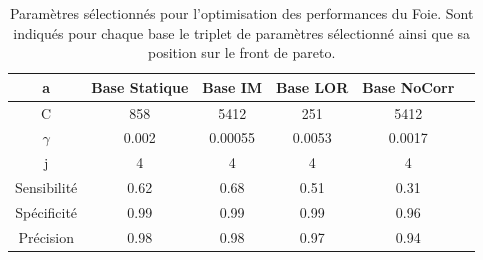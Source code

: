 \begin{table}[h!]
		\begin{tabular}{c| c c c c c}
  \hline
  a	& Base Statique	& Base IM	& Base LOR	& Base NoCorr	\\
  \hline
 C 	& 858		& 5412		& 251		& 5412		\\
\hline
$\gamma$& 0.002		& 0.00055	& 0.0053	& 0.0017	\\
\hline
j	& 4		& 4		& 4		& 4		\\
\hline
\hline
Sensibilité& 0.62	& 0.68		& 0.51		& 0.31	\\
\hline
Spécificité& 0.99	& 0.99		& 0.99		& 0.96		\\
\hline
Précision& 0.98		& 0.98		& 0.97		& 0.94		\\
\hline
 		\end{tabular}

\caption{Paramètres sélectionnés pour l'optimisation des performances du Foie. Sont indiqués pour chaque base le triplet de paramètres sélectionné ainsi que sa position sur le front de pareto.}
\label{fig:paramsModFoie}
\end{table}
